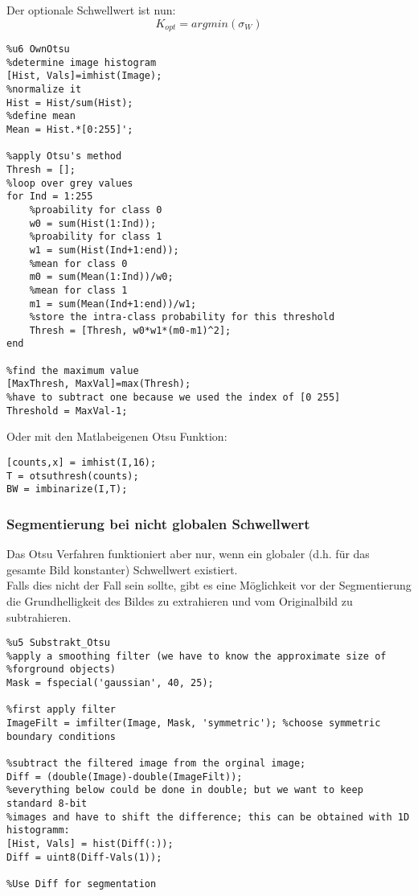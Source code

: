 Der optionale Schwellwert ist nun:
\begin{equation}
K_{opt}=argmin(\sigma_W)
\end{equation}
\begin{lstlisting}
%u6 OwnOtsu
%determine image histogram
[Hist, Vals]=imhist(Image);
%normalize it
Hist = Hist/sum(Hist);
%define mean
Mean = Hist.*[0:255]';

%apply Otsu's method
Thresh = [];
%loop over grey values
for Ind = 1:255
    %proability for class 0
    w0 = sum(Hist(1:Ind));
    %proability for class 1
    w1 = sum(Hist(Ind+1:end));
    %mean for class 0
    m0 = sum(Mean(1:Ind))/w0;
    %mean for class 1
    m1 = sum(Mean(Ind+1:end))/w1;
    %store the intra-class probability for this threshold
    Thresh = [Thresh, w0*w1*(m0-m1)^2];
end

%find the maximum value
[MaxThresh, MaxVal]=max(Thresh);
%have to subtract one because we used the index of [0 255]
Threshold = MaxVal-1;
\end{lstlisting}
Oder mit den Matlabeigenen Otsu Funktion:
\begin{lstlisting}
[counts,x] = imhist(I,16);
T = otsuthresh(counts);
BW = imbinarize(I,T);
\end{lstlisting}
\subsubsection{Segmentierung bei nicht globalen Schwellwert}
Das Otsu Verfahren funktioniert aber nur, wenn ein globaler (d.h. für das gesamte Bild konstanter) Schwellwert existiert.\\
Falls dies nicht der Fall sein sollte, gibt es eine Möglichkeit vor der Segmentierung die Grundhelligkeit des Bildes zu extrahieren und vom Originalbild zu subtrahieren.
\begin{lstlisting}
%u5 Substrakt_Otsu
%apply a smoothing filter (we have to know the approximate size of
%forground objects)
Mask = fspecial('gaussian', 40, 25);

%first apply filter
ImageFilt = imfilter(Image, Mask, 'symmetric'); %choose symmetric boundary conditions

%subtract the filtered image from the orginal image; 
Diff = (double(Image)-double(ImageFilt));
%everything below could be done in double; but we want to keep standard 8-bit
%images and have to shift the difference; this can be obtained with 1D histogramm:  
[Hist, Vals] = hist(Diff(:));
Diff = uint8(Diff-Vals(1));

%Use Diff for segmentation
\end{lstlisting}


